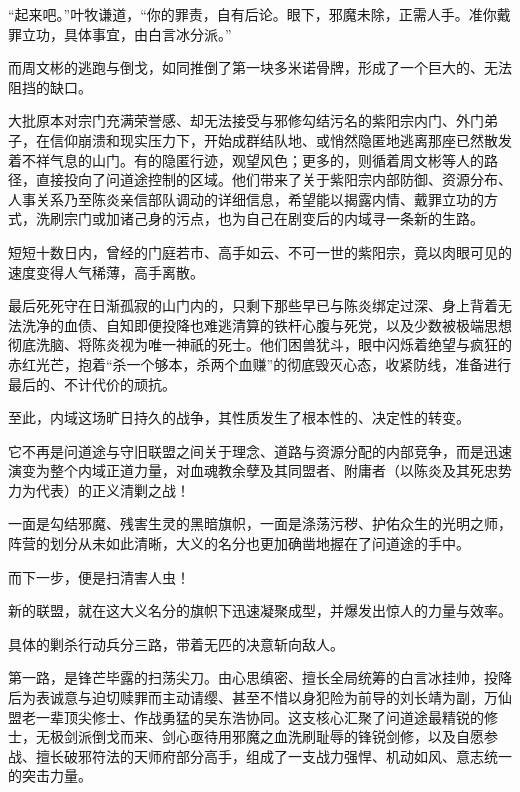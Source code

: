 “起来吧。”叶牧谦道，“你的罪责，自有后论。眼下，邪魔未除，正需人手。准你戴罪立功，具体事宜，由白言冰分派。”

\vspace{2em}

而周文彬的逃跑与倒戈，如同推倒了第一块多米诺骨牌，形成了一个巨大的、无法阻挡的缺口。

大批原本对宗门充满荣誉感、却无法接受与邪修勾结污名的紫阳宗内门、外门弟子，在信仰崩溃和现实压力下，开始成群结队地、或悄然隐匿地逃离那座已然散发着不祥气息的山门。有的隐匿行迹，观望风色；更多的，则循着周文彬等人的路径，直接投向了问道途控制的区域。他们带来了关于紫阳宗内部防御、资源分布、人事关系乃至陈炎亲信部队调动的详细信息，希望能以揭露内情、戴罪立功的方式，洗刷宗门或加诸己身的污点，也为自己在剧变后的内域寻一条新的生路。

短短十数日内，曾经的门庭若市、高手如云、不可一世的紫阳宗，竟以肉眼可见的速度变得人气稀薄，高手离散。

最后死死守在日渐孤寂的山门内的，只剩下那些早已与陈炎绑定过深、身上背着无法洗净的血债、自知即便投降也难逃清算的铁杆心腹与死党，以及少数被极端思想彻底洗脑、将陈炎视为唯一神祇的死士。他们困兽犹斗，眼中闪烁着绝望与疯狂的赤红光芒，抱着“杀一个够本，杀两个血赚”的彻底毁灭心态，收紧防线，准备进行最后的、不计代价的顽抗。

至此，内域这场旷日持久的战争，其性质发生了根本性的、决定性的转变。

它不再是问道途与守旧联盟之间关于理念、道路与资源分配的内部竞争，而是迅速演变为整个内域正道力量，对血魂教余孽及其同盟者、附庸者（以陈炎及其死忠势力为代表）的正义清剿之战！

一面是勾结邪魔、残害生灵的黑暗旗帜，一面是涤荡污秽、护佑众生的光明之师，阵营的划分从未如此清晰，大义的名分也更加确凿地握在了问道途的手中。

而下一步，便是扫清害人虫！

\vspace{2em}

新的联盟，就在这大义名分的旗帜下迅速凝聚成型，并爆发出惊人的力量与效率。

具体的剿杀行动兵分三路，带着无匹的决意斩向敌人。

第一路，是锋芒毕露的扫荡尖刀。由心思缜密、擅长全局统筹的白言冰挂帅，投降后为表诚意与迫切赎罪而主动请缨、甚至不惜以身犯险为前导的刘长靖为副，万仙盟老一辈顶尖修士、作战勇猛的吴东浩协同。这支核心汇聚了问道途最精锐的修士，无极剑派倒戈而来、剑心亟待用邪魔之血洗刷耻辱的锋锐剑修，以及自愿参战、擅长破邪符法的天师府部分高手，组成了一支战力强悍、机动如风、意志统一的突击力量。

